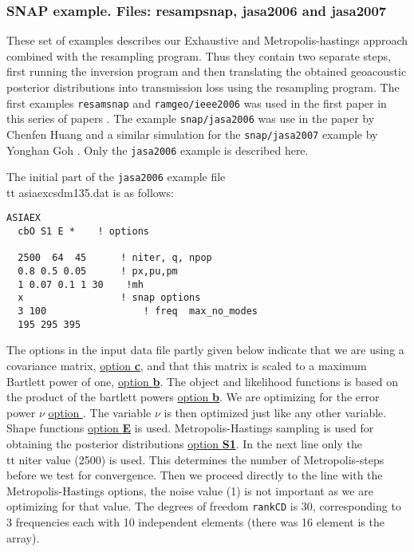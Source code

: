 \documentclass{saclantc}
\begin{document}
\subsubsection{SNAP example. Files: resampsnap, jasa2006 and jasa2007}
These set of examples describes our Exhaustive and Metropolis-hastings approach combined with the resampling program. Thus they contain two separate steps, first running the inversion program and then translating the obtained geoacoustic posterior distributions into transmission loss using the resampling program. The first examples {\tt resamsnap} and {\tt ramgeo/ieee2006} was used in the first paper in this series of papers \cite{gerstoft06}. The example {\tt snap/jasa2006} was use in the paper by Chenfen Huang \cite{huang06} and a similar simulation for the {\tt snap/jasa2007} example by Yonghan Goh \cite{goh07}. Only the {\tt jasa2006} example is described here.

The initial part of the {\tt jasa2006} example file {\\tt asiaexcsdm135.dat} is as follows:
\small
\begin{verbatim}
ASIAEX
  cbO S1 E *	! options 

  2500  64  45		! niter, q, npop
  0.8 0.5 0.05		! px,pu,pm
  1 0.07 0.1 1 30    !mh
  x            		! snap options
  3 100              	! freq  max_no_modes
  195 295 395  
\end{verbatim}
\normalsize

The options in the input data file partly given below indicate that we are using a
covariance matrix, \underline{option {\bf c}}, and that this
matrix is scaled to a maximum Bartlett power of one, \underline{option
{\bf b}}. The object and likelihood functions is based on the product of the bartlett powers \underline{option
{\bf b}}. We are optimizing for the error power $\nu$ \underline{option
{\bf *}}. The variable  $\nu$ is then optimized just like any other variable. Shape functions \underline{option
{\bf E}} is used. Metropolis-Hastings sampling is used for obtaining the posterior distributions \underline{option
{\bf S1}}.
In the next line only the {\\tt niter} value (2500) is used. This determines the number of Metropolis-steps before we test for convergence.
Then we proceed directly to the line with the Metropolis-Hastings options, the noise value  (1) is not important as we are optimizing for that value.
The degrees of freedom {\tt rankCD} is 30, corresponding to 3 frequencies each with 10 independent elements (there was 16 element is the array).
\end{document}
